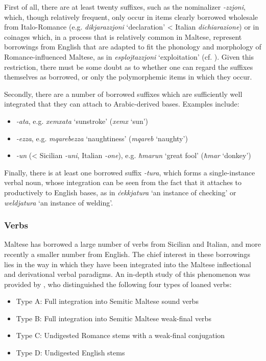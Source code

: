 \documentclass[output=paper]{langsci/langscibook}
\begin{document}
First of all, there are at least twenty suffixes, such as the nominalizer \textit{-zzjoni}, which, though relatively frequent, only occur in items clearly borrowed wholesale from Italo-Romance (e.g. \textit{dikjarazzjoni} `declaration' < Italian \textit{dichiarazione}) or in coinages which, in a process that is relatively common in Maltese, represent borrowings from English that are adapted to fit the phonology and morphology of Romance-influenced Maltese, as in \textit{esplojtazzjoni} `exploitation' (cf. \citealt{gattfabri2018}). Given this restriction, there must be some doubt as to whether one can regard the suffixes themselves as borrowed, or only the polymorphemic items in which they occur.

Secondly, there are a number of borrowed suffixes which are sufficiently well integrated that they can attach to Arabic-derived bases. Examples include:

\begin{itemize}[noitemsep]
	\item[] \textit{-ata}, e.g. \textit{xemxata} `sunstroke' (\textit{xemx} `sun')
    \item[] \textit{-ezza}, e.g. \textit{mqarebezza} `naughtiness' (\textit{mqareb} `naughty') 
    \item[] \textit{-un} (< Sicilian \textit{-uni}, Italian \textit{-one}), e.g. \textit{ħmarun} `great fool' (\textit{ħmar} `donkey')
\end{itemize}

Finally, there is at least one borrowed suffix \textit{-tura}, which forms a single-instance verbal noun, whose integration can be seen from the fact that it attaches to productively to English bases, as in \textit{ċekkjatura} `an instance of checking' or \textit{weldjatura} `an instance of welding'.

\subsubsection{Verbs}\label{verbmorphology}
\label{loanedverbs} 
Maltese has borrowed a large number of verbs from Sicilian and Italian, and more recently a smaller number from English. The chief interest in these borrowings lies in the way in which they have been integrated into the Maltese inflectional and derivational verbal paradigms. An in-depth study of this phenomenon was provided by \cite{mifsudloanverbs}, who distinguished the following four types of loaned verbs:

\begin{itemize}[noitemsep]
	\item[] Type A: Full integration into Semitic Maltese sound verbs 
    \item[] Type B: Full integration into Semitic Maltese weak-final verbs
    \item[] Type C: Undigested Romance stems with a weak-final conjugation
    \item[] Type D: Undigested English stems
\end{itemize}
\end{document}
